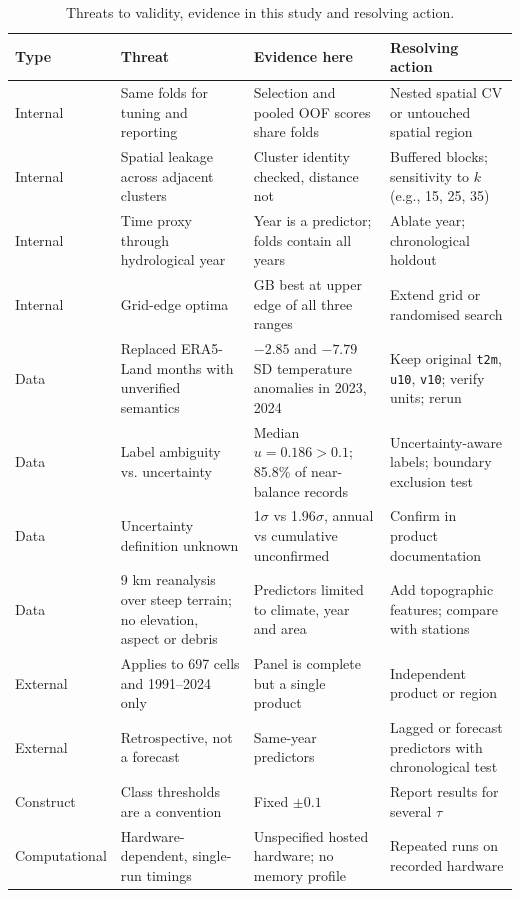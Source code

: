\documentclass[conference]{IEEEtran}
\begin{document}
\begin{table}[t]
\caption{Threats to validity, evidence in this study and resolving action.}
\label{tab:threats}
\centering
\footnotesize
\setlength{\tabcolsep}{3pt}
\begin{tabular}{p{}p{}p{}p{}}
\toprule
Type & Threat & Evidence here & Resolving action\\
\midrule
Internal & Same folds for tuning and reporting & Selection and pooled OOF scores share folds & Nested spatial CV or untouched spatial region\\
Internal & Spatial leakage across adjacent clusters & Cluster identity checked, distance not & Buffered blocks; sensitivity to $k$ (e.g., 15, 25, 35)\\
Internal & Time proxy through hydrological year & Year is a predictor; folds contain all years & Ablate year; chronological holdout\\
Internal & Grid-edge optima & GB best at upper edge of all three ranges & Extend grid or randomised search\\
Data & Replaced ERA5-Land months with unverified semantics & $-2.85$ and $-7.79$ SD temperature anomalies in 2023, 2024 & Keep original \texttt{t2m}, \texttt{u10}, \texttt{v10}; verify units; rerun\\
Data & Label ambiguity vs. uncertainty & Median $u=0.186>0.1$; 85.8\% of near-balance records & Uncertainty-aware labels; boundary exclusion test\\
Data & Uncertainty definition unknown & 1$\sigma$ vs 1.96$\sigma$, annual vs cumulative unconfirmed & Confirm in product documentation\\
Data & 9 km reanalysis over steep terrain; no elevation, aspect or debris & Predictors limited to climate, year and area & Add topographic features; compare with stations\\
External & Applies to 697 cells and 1991--2024 only & Panel is complete but a single product & Independent product or region\\
External & Retrospective, not a forecast & Same-year predictors & Lagged or forecast predictors with chronological test\\
Construct & Class thresholds are a convention & Fixed $\pm0.1$ & Report results for several $\tau$\\
Computational & Hardware-dependent, single-run timings & Unspecified hosted hardware; no memory profile & Repeated runs on recorded hardware\\
\bottomrule
\end{tabular}
\end{table}
\end{document}
